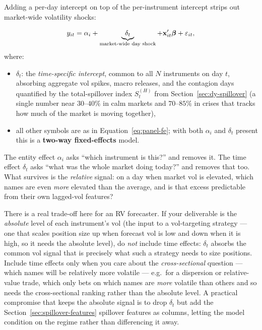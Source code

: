 Adding a per-day intercept on top of the per-instrument
intercept strips out market-wide volatility shocks:

\begin{equation}\label{eq:panel-twoway-fe}
  y_{it} = \alpha_i
           + \underbrace{\delta_t}_{\text{market-wide day shock}}
           + \mathbf{x}_{it}'\bm{\beta} + \varepsilon_{it},
\end{equation}
where:
\begin{itemize}[nosep]
  \item $\delta_t$: the \emph{time-specific intercept}, common to all $N$
        instruments on day $t$, absorbing aggregate vol spikes, macro releases,
        and the contagion days quantified by the total-spillover index $S^{(H)}_t$
        from Section~\ref{sec:dy-spillover} (a single number near $30$--$40\%$ in
        calm markets and $70$--$85\%$ in crises that tracks how much of the market
        is moving together),
  \item all other symbols are as in Equation~\eqref{eq:panel-fe}; with both
        $\alpha_i$ and $\delta_t$ present this is a \textbf{two-way fixed-effects}
        model.
\end{itemize}

\begin{intuition}
The entity effect $\alpha_i$ asks ``which instrument is this?'' and removes it.
The time effect $\delta_t$ asks ``what was the whole market doing today?'' and
removes that too.  What survives is the \emph{relative} signal: on a day when
market vol is elevated, which names are even \emph{more} elevated than the
average, and is that excess predictable from their own lagged-vol features?
\end{intuition}

\begin{projectconnection}
There is a real trade-off here for an RV forecaster.  If your deliverable is the
\emph{absolute} level of each instrument's vol (the input to a vol-targeting
strategy --- one that scales position size up when forecast vol is low and down
when it is high, so it needs the absolute level), do \emph{not} include time
effects: $\delta_t$ absorbs the common vol signal that is precisely what such a
strategy needs to size positions.  Include time effects only when you care about
the \emph{cross-sectional} question --- which names will be relatively more
volatile --- e.g.\ for a dispersion or relative-value trade, which only bets on
which names are \emph{more} volatile than others and so needs the cross-sectional
ranking rather than the absolute level.  A practical compromise that
keeps the absolute signal is to drop $\delta_t$ but add the
Section~\ref{sec:spillover-features} spillover features as columns, letting the
model condition on the regime rather than differencing it away.
\end{projectconnection}

